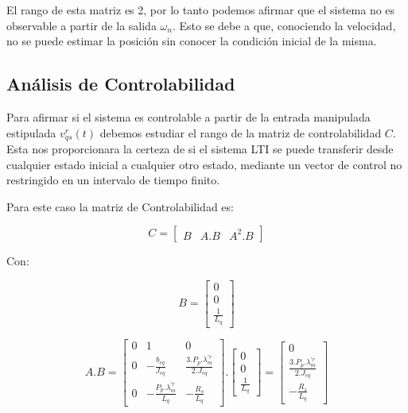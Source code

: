 \documentclass{article}
\begin{document}
El rango de esta matriz es 2, por lo tanto podemos afirmar que el sistema no es observable a 
partir de la salida $\omega_n$. Esto se debe a que, conociendo la velocidad, no se puede estimar la 
posición sin conocer la condición inicial de la misma.


\subsection{Análisis de Controlabilidad}

Para afirmar si el sistema es controlable a partir de la entrada manipulada estipulada 
$v_{qs}^r(t)$ debemos estudiar el rango de la matriz de controlabilidad $C$. Esta nos 
proporcionara la certeza de si el sistema LTI se puede transferir desde cualquier estado inicial
a cualquier otro estado, mediante un vector de control no restringido en un intervalo de tiempo 
finito.

Para este caso la matriz de Controlabilidad es:

\begin{equation}
    C = 
    \begin{bmatrix}
        B & A.B & A^2.B
    \end{bmatrix}
\end{equation}

Con:

\begin{equation*}
    B = 
    \begin{bmatrix}
        0 \\
        0 \\
        \frac{1}{L_q}
    \end{bmatrix}
\end{equation*}

\begin{equation*}
    A.B = 
    \begin{bmatrix}
        0 & 1 & 0 \\
        0 & -\frac{b_{eq}}{J_{eq}} & \frac{3.P_p.\lambda_m^{\prime r}}{2.J_{eq}} \\
        0 & -\frac{P_p.\lambda_m^{\prime r}}{L_q} & -\frac{R_s}{L_q}
    \end{bmatrix}.
    \begin{bmatrix}
        0 \\
        0 \\
        \frac{1}{L_q}
    \end{bmatrix}
    =
    \begin{bmatrix}
        0 \\
        \frac{3.P_p.\lambda_m^{\prime r}}{2.J_{eq}} \\
        -\frac{R_s}{L_q}
    \end{bmatrix}
\end{equation*}
\end{document}
